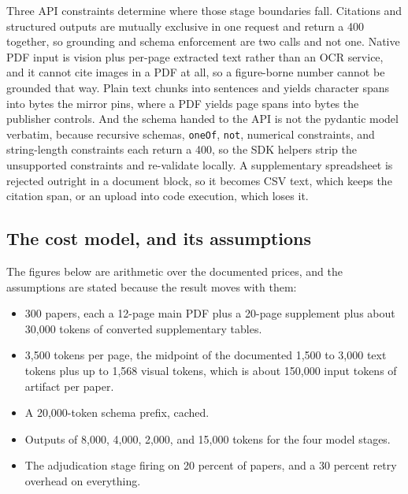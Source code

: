 Three API constraints determine where those stage boundaries fall. Citations and structured
outputs are mutually exclusive in one request and return a 400 together, so grounding and
schema enforcement are two calls and not one. Native PDF input is vision plus per-page
extracted text rather than an OCR service, and it cannot cite images in a PDF at all, so a
figure-borne number cannot be grounded that way. Plain text chunks into sentences and yields
character spans into bytes the mirror pins, where a PDF yields page spans into bytes the
publisher controls. And the schema handed to the API is not the pydantic model verbatim,
because recursive schemas, \texttt{oneOf}, \texttt{not}, numerical constraints, and
string-length constraints each return a 400, so the SDK helpers strip the unsupported
constraints and re-validate locally. A supplementary spreadsheet is rejected outright in a
document block, so it becomes CSV text, which keeps the citation span, or an upload into code
execution, which loses it.

\subsection{The cost model, and its assumptions}\label{sec:pipeline-cost}

The figures below are arithmetic over the documented prices, and the assumptions are stated
because the result moves with them:

\begin{itemize}[leftmargin=1.2em,itemsep=1pt,topsep=2pt]
  \item 300 papers, each a 12-page main PDF plus a 20-page supplement plus about 30,000 tokens
    of converted supplementary tables.
  \item 3,500 tokens per page, the midpoint of the documented 1,500 to 3,000 text tokens plus
    up to 1,568 visual tokens, which is about 150,000 input tokens of artifact per paper.
  \item A 20,000-token schema prefix, cached.
  \item Outputs of 8,000, 4,000, 2,000, and 15,000 tokens for the four model stages.
  \item The adjudication stage firing on 20 percent of papers, and a 30 percent retry
    overhead on everything.
\end{itemize}

